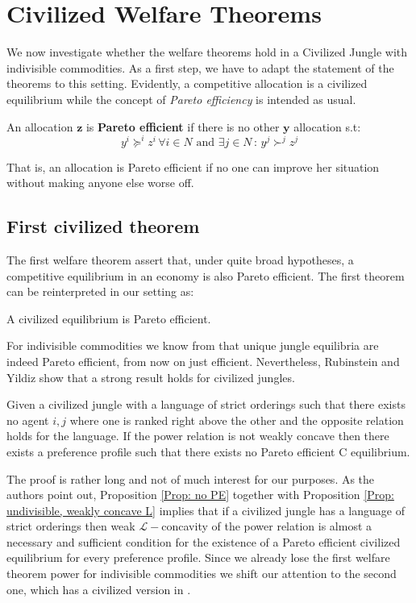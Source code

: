 \section{Civilized Welfare Theorems}

We now investigate whether the welfare theorems hold in a Civilized Jungle with indivisible commodities. As a first step, we have to adapt the statement of the theorems to this setting. Evidently, a competitive allocation is a civilized equilibrium while the concept of \textit{Pareto efficiency} is intended as usual.

\begin{definition}
    An allocation $\textbf{z}$ is \textbf{Pareto efficient} if there is no other $\textbf{y}$ allocation s.t:
    \[y^i\succeq^iz^i\,\forall i\in N \text{ and } \exists j\in N \,: \,y^j\succ^jz^j \]
\end{definition}

That is, an allocation is Pareto efficient if no one can improve her situation without making anyone else worse off. 

\subsection{First civilized theorem}

The first welfare theorem assert that, under quite broad hypotheses, a competitive equilibrium in an economy is also Pareto efficient. The first theorem can be reinterpreted in our setting as:

\begin{center}
    A civilized equilibrium is Pareto efficient.
\end{center}

For indivisible commodities we know from \cite*[PR]{P-R} that unique jungle equilibria are indeed Pareto efficient, from now on just efficient. Nevertheless, Rubinstein and Yildiz \cite[RY]{RY} show that a strong result holds for civilized jungles.

\begin{proposition}\label{Prop: no PE}
    Given a civilized jungle with a language of strict orderings such that there exists no agent $i,j$ where one is ranked right above the other and the opposite relation holds for the language. If the power relation is not weakly concave then there exists a preference profile such that there exists no Pareto efficient C equilibrium. 
\end{proposition}

The proof is rather long and not of much interest for our purposes. As the authors point out, Proposition \ref{Prop: no PE} together with Proposition \ref{Prop: undivisible, weakly concave L} implies that if a civilized jungle has a language of strict orderings then weak $\mathcal{L}-$concavity of the power relation is almost a necessary and sufficient condition for the existence of a Pareto efficient civilized equilibrium for every preference profile.  
Since we already lose the first welfare theorem power for indivisible commodities we shift our attention to the second one, which has a civilized version in \cite[RY]{RY}.

